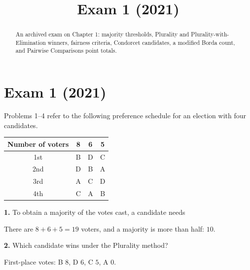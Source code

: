 \documentclass[12pt]{ximera}
\title{Exam 1 (2021)}
\begin{document}
\begin{abstract}
An archived exam on Chapter 1: majority thresholds, Plurality and Plurality-with-Elimination winners, fairness criteria, Condorcet candidates, a modified Borda count, and Pairwise Comparisons point totals.
\end{abstract}
\maketitle

\section*{Exam 1 (2021)}

\begin{problem}
Problems 1--4 refer to the following preference schedule for an election with four
candidates.
\begin{center}
\begin{tabular}{c|ccc}
Number of voters & 8 & 6 & 5\\\hline
1st & B & D & C\\
2nd & D & B & A\\
3rd & A & C & D\\
4th & C & A & B
\end{tabular}
\end{center}

\begin{prompt}
\textbf{1.} To obtain a majority of the votes cast, a candidate needs

\begin{multipleChoice}
\end{multipleChoice}

\begin{feedback}
There are $8+6+5=19$ voters, and a majority is more than half: $10$.
\end{feedback}
\end{prompt}

\begin{prompt}
\textbf{2.} Which candidate wins under the Plurality method?

\begin{multipleChoice}
\end{multipleChoice}

\begin{feedback}
First-place votes: B $8$, D $6$, C $5$, A $0$.
\end{feedback}
\end{prompt}


\end{problem}
\end{document}
